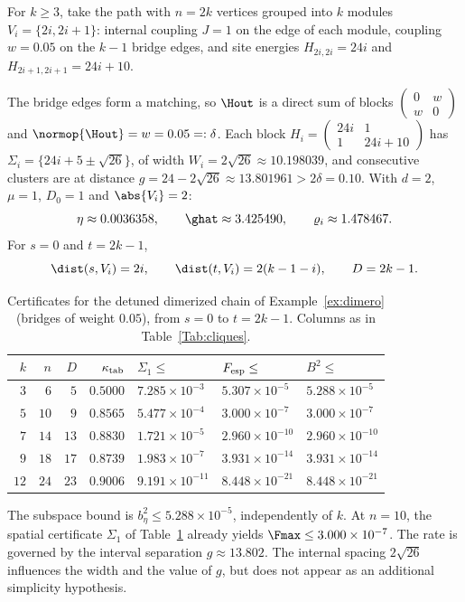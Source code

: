 \begin{exemplo}\label{ex:dimero}
For $k\ge3$, take the path with $n=2k$ vertices grouped into $k$ modules
$V_i=\{2i,2i+1\}$: internal coupling $J=1$ on the edge of each module, coupling
$w=0.05$ on the $k-1$ bridge edges, and site energies $H_{2i,2i}=24i$ and
$H_{2i+1,2i+1}=24i+10$.

The bridge edges form a matching, so $\Hout$ is a direct sum of
blocks $\left(\begin{smallmatrix}0&w\\w&0\end{smallmatrix}\right)$ and
$\normop{\Hout}=w=0.05=: \delta$. Each block
$H_i=\left(\begin{smallmatrix}24i&1\\1&24i+10\end{smallmatrix}\right)$ has
$\Sigma_i=\{24i+5\pm\sqrt{26}\}$, of width
$W_i=2\sqrt{26}\approx10.198039$, and consecutive clusters are at distance
$g=24-2\sqrt{26}\approx13.801961>2\delta=0.10$. With $d=2$, $\mu=1$,
$D_0=1$ and $\abs{V_i}=2$:
\[
\eta\approx0.0036358,\qquad \ghat\approx3.425490,\qquad
\varrho_i\approx1.478467 .
\]
For $s=0$ and $t=2k-1$,
\[
\dist(s,V_i)=2i,\qquad
\dist(t,V_i)=2(k-1-i),\qquad
D=2k-1.
\]

\begin{table}[t]
\centering
\small
\setlength{\tabcolsep}{4pt}
\caption{Certificates for the detuned dimerized chain of
Example~\ref{ex:dimero} (bridges of weight $0.05$), from $s=0$ to $t=2k-1$.
Columns as in Table~\ref{Tab:cliques}.}
\label{Tab:dimero}
\begin{tabular}{rrrrlll}
\toprule
$k$ & $n$ & $D$ & $\kappa_{\rm tab}$ & $\Sigma_1\le$ & $F_{\rm esp}\le$ & $B^2\le$\\
\midrule
$3$ & $6$ & $5$ & $0.5000$ & $7.285\times10^{-3}$ & $5.307\times10^{-5}$ & $5.288\times10^{-5}$\\
$5$ & $10$ & $9$ & $0.8565$ & $5.477\times10^{-4}$ & $3.000\times10^{-7}$ & $3.000\times10^{-7}$\\
$7$ & $14$ & $13$ & $0.8830$ & $1.721\times10^{-5}$ & $2.960\times10^{-10}$ & $2.960\times10^{-10}$\\
$9$ & $18$ & $17$ & $0.8739$ & $1.983\times10^{-7}$ & $3.931\times10^{-14}$ & $3.931\times10^{-14}$\\
$12$ & $24$ & $23$ & $0.9006$ & $9.191\times10^{-11}$ & $8.448\times10^{-21}$ & $8.448\times10^{-21}$\\
\bottomrule
\end{tabular}
\end{table}

\noindent The subspace bound is $b_\eta^2\le5.288\times10^{-5}$,
independently of $k$. At $n=10$, the spatial certificate $\Sigma_1$ of
Table~\ref{Tab:dimero} already yields $\Fmax\le3.000\times10^{-7}$. The rate is governed by the interval separation
$g\approx13.802$. The internal spacing $2\sqrt{26}$ influences the width
and the value of $g$, but does not appear as an additional simplicity hypothesis.

\end{exemplo}

